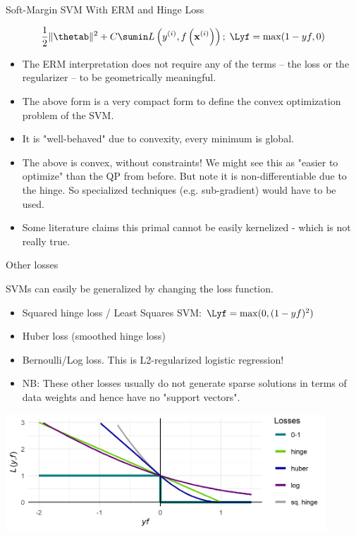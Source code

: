 \documentclass[11pt,compress,t,notes=noshow, xcolor=table]{beamer}
\begin{document}
\begin{vbframe}{Soft-Margin SVM With ERM and Hinge Loss}
\framebreak

  $$ \frac{1}{2} \|\thetab\|^2 + C \sumin \Lxyi ;\; \Lyf = \max(1-yf, 0)$$
\begin{itemize}
 \item  The ERM interpretation does not require any of the terms -- the loss or the regularizer -- to be geometrically meaningful.
  \item The above form is a very compact form to define the convex optimization problem of the SVM. 
  \item It is "well-behaved" due to convexity, every minimum is global.
  \item The above is convex, without constraints! We might see this as "easier to optimize" than the QP from before. But note it is non-differentiable due to the hinge. 
    So specialized techniques (e.g. sub-gradient) would have to be used. 
  \item Some literature claims this primal cannot be easily kernelized - which is not really true.
  \end{itemize}
\end{vbframe}

\begin{vbframe}{Other losses}

  SVMs can easily be generalized by changing the loss function.
  \begin{itemize}
    \item Squared hinge loss / Least Squares SVM: $\Lyf = \max(0, (1 - yf)^2)$ 
    \item Huber loss (smoothed hinge loss)
    \item Bernoulli/Log loss. This is L2-regularized logistic regression!
    \item NB: These other losses usually do not generate sparse solutions in terms of 
      data weights and hence have no "support vectors".
  \end{itemize}


\begin{center}
\includegraphics[width = 0.9\textwidth]{figure/other_losses.png} \\
\end{center}


\end{vbframe}


\endlecture
\end{document}

